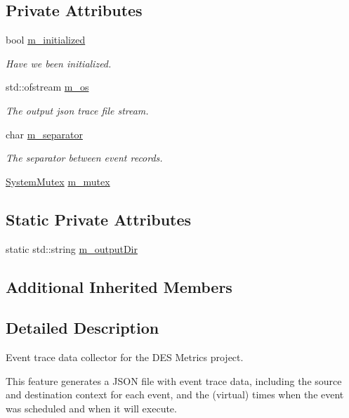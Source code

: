 \subsection*{Private Attributes}
\begin{DoxyCompactItemize}
\item 
bool \hyperlink{classns3_1_1DesMetrics_a229b920334708658e4d3b5ebf5e24c4c}{m\+\_\+initialized}
\begin{DoxyCompactList}\small\item\em Have we been initialized. \end{DoxyCompactList}\item 
std\+::ofstream \hyperlink{classns3_1_1DesMetrics_ae84cea9d7b1c24d810e741bd8c46b430}{m\+\_\+os}
\begin{DoxyCompactList}\small\item\em The output json trace file stream. \end{DoxyCompactList}\item 
char \hyperlink{classns3_1_1DesMetrics_ab4a6d1bac1d7bae3db17cf362d4afaa8}{m\+\_\+separator}
\begin{DoxyCompactList}\small\item\em The separator between event records. \end{DoxyCompactList}\item 
\hyperlink{classns3_1_1SystemMutex}{System\+Mutex} \hyperlink{classns3_1_1DesMetrics_a05ad210056128f0154901516cbb884dc}{m\+\_\+mutex}
\end{DoxyCompactItemize}
\subsection*{Static Private Attributes}
\begin{DoxyCompactItemize}
\item 
static std\+::string \hyperlink{classns3_1_1DesMetrics_affd6e3b6d411b401491d711506734d75}{m\+\_\+output\+Dir}
\end{DoxyCompactItemize}
\subsection*{Additional Inherited Members}


\subsection{Detailed Description}
Event trace data collector for the D\+ES Metrics project. 

This feature generates a J\+S\+ON file with event trace data, including the source and destination context for each event, and the (virtual) times when the event was scheduled and when it will execute.

